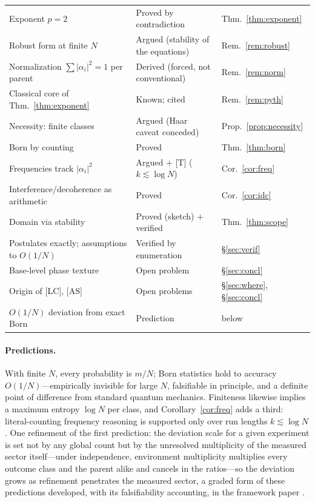 \documentclass[11pt]{article}
\theoremstyle{definition}
\theoremstyle{remark}
\begin{document}
\begin{center}
\begin{tabular}{@{}lll@{}}
Exponent $p = 2$ & Proved by contradiction & Thm.~\ref{thm:exponent}\\
Robust form at finite $N$ & Argued (stability of the equations) & Rem.~\ref{rem:robust}\\
Normalization $\sum|\alpha_i|^2 = 1$ per parent & Derived (forced, not conventional) & Rem.~\ref{rem:norm}\\
Classical core of Thm.~\ref{thm:exponent} & Known; cited & Rem.~\ref{rem:pyth}\\
Necessity: finite classes & Argued (Haar caveat conceded) & Prop.~\ref{prop:necessity}\\
Born by counting & Proved & Thm.~\ref{thm:born}\\
Frequencies track $|\alpha_i|^2$ & Argued $+$ [T] ($k \lesssim \log N$) & Cor.~\ref{cor:freq}\\
Interference/decoherence as arithmetic & Proved & Cor.~\ref{cor:idc}\\
Domain via stability & Proved (sketch) $+$ verified & Thm.~\ref{thm:scope}\\
Postulates exactly; assumptions to $O(1/N)$ & Verified by enumeration & \S\ref{sec:verif}\\
Base-level phase texture & Open problem & \S\ref{sec:concl}\\
Origin of [LC], [AS] & Open problems & \S\ref{sec:where}, \S\ref{sec:concl}\\
$O(1/N)$ deviation from exact Born & Prediction & below\\
\bottomrule
\end{tabular}
\end{center}

\paragraph{Predictions.} With finite $N$, every probability is $m/N$; Born statistics hold to accuracy $O(1/N)$---empirically invisible for large $N$, falsifiable in principle, and a definite point of difference from standard quantum mechanics. Finiteness likewise implies a maximum entropy $\log N$ per class, and Corollary~\ref{cor:freq} adds a third: literal-counting frequency reasoning is supported only over run lengths $k \lesssim \log N$. One refinement of the first prediction: the deviation scale for a given experiment is set not by any global count but by the unresolved multiplicity of the measured sector itself---under independence, environment multiplicity multiplies every outcome class and the parent alike and cancels in the ratios---so the deviation grows as refinement penetrates the measured sector, a graded form of these predictions developed, with its falsifiability accounting, in the framework paper \cite{TillittCR}.
\end{document}
